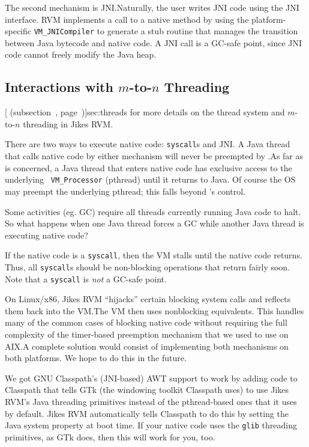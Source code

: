 The second mechanism is JNI.\@  Naturally, the user writes JNI code
using the JNI interface.  RVM implements a call to a native method by
using the platform-specific {\tt VM\_JNICompiler} to generate a stub
routine that manages the transition between Java bytecode and native
code.  A JNI call is a GC-safe point, since JNI code cannot freely
modify the Java heap. 

\subsection{Interactions with $m$-to-$n$ Threading}
[ (subsection~\Ref,
page~\Pageref)]{sec:threads} for more details on the thread system
and $m$-to-$n$ threading in Jikes RVM.\@ 

There are two ways to execute native code: {\tt syscall}s and JNI.\@
A Java thread that calls native code by either mechanism will never
be preempted by \jrvm{}.\@  As far as \jrvm{} is concerned, a Java thread that
enters native code has exclusive access to the underlying {\tt
VM\_Processor} (pthread) until it returns to Java.  Of course the OS may preempt the underlying
pthread; this falls beyond \jrvm{}'s control.

Some activities (eg. GC) require all threads currently running Java code to halt.  
So what happens when one Java thread forces a GC while another Java thread is
executing native code?

If the native code is a {\tt syscall}, then the VM stalls until the native
code returns.  Thus, all {\tt syscall}s should be non-blocking
operations that return fairly soon.  Note that a {\tt syscall} is 
{\em not} a GC-safe point.

%
%
On Linux/x86, Jikes RVM ``hijacks'' certain blocking system calls and
reflects them back into the VM.\@  The VM then uses nonblocking
equivalents. This handles many of the common cases of blocking native
code without requiring the full complexity of the timer-based
preemption mechanism that we used to use on AIX.\@  A complete
solution would consist of implementing both mechanisms on both
platforms.  We hope to do this in the future.

We got GNU Classpath's (JNI-based) AWT support to work by adding code to
Classpath that tells GTk (the windowing toolkit Classpath uses) to use Jikes
RVM's Java threading primitives instead of the pthread-based ones that
it uses by default.  Jikes RVM automatically tells Classpath to do
this by setting the Java system property
at boot time.  If your native code uses the \texttt{glib} threading
primitives, as GTk does, then this will work for you, too.  

